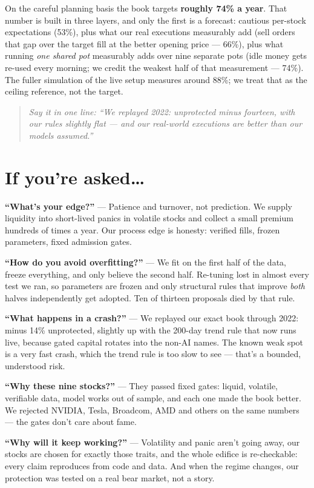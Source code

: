 \documentclass[11pt,a4paper]{article}
\newcommand{\oneline}[1]{\begin{quote}\itshape\color{bcteal}Say it in one line:
``#1''\end{quote}}
\begin{document}
On the careful planning basis the book targets \textbf{roughly 74\% a year}.
That number is built in three layers, and only the first is a forecast:
cautious per-stock expectations (53\%), plus what our real executions
measurably add (sell orders that gap over the target fill at the better
opening price --- 66\%), plus what running \emph{one shared pot} measurably
adds over nine separate pots (idle money gets re-used every morning; we
credit the weakest half of that measurement --- 74\%). The fuller simulation
of the live setup measures around 88\%; we treat that as the ceiling
reference, not the target.

\oneline{We replayed 2022: unprotected minus fourteen, with our rules slightly
flat --- and our real-world executions are better than our models assumed.}

\section{If you're asked\ldots}

\begin{tcolorbox}[colback=bcnavy!5, colframe=bcnavy, boxrule=0.8pt,
  title={\bfseries Five questions you should be ready for}, coltitle=white]
\textbf{``What's your edge?''} --- Patience and turnover, not prediction. We
supply liquidity into short-lived panics in volatile stocks and collect a
small premium hundreds of times a year. Our process edge is honesty: verified
fills, frozen parameters, fixed admission gates.

\textbf{``How do you avoid overfitting?''} --- We fit on the first half of the
data, freeze everything, and only believe the second half. Re-tuning lost in
almost every test we ran, so parameters are frozen and only structural rules
that improve \emph{both} halves independently get adopted. Ten of thirteen
proposals died by that rule.

\textbf{``What happens in a crash?''} --- We replayed our exact book through
2022: minus 14\% unprotected, slightly up with the 200-day trend rule that
now runs live, because gated capital rotates into the non-AI names. The known
weak spot is a very fast crash, which the trend rule is too slow to see ---
that's a bounded, understood risk.

\textbf{``Why these nine stocks?''} --- They passed fixed gates: liquid,
volatile, verifiable data, model works out of sample, and each one made the
book better. We rejected NVIDIA, Tesla, Broadcom, AMD and others on the same
numbers --- the gates don't care about fame.

\textbf{``Why will it keep working?''} --- Volatility and panic aren't going
away, our stocks are chosen for exactly those traits, and the whole edifice
is re-checkable: every claim reproduces from code and data. And when the
regime changes, our protection was tested on a real bear market, not a
story.
\end{tcolorbox}
\end{document}
